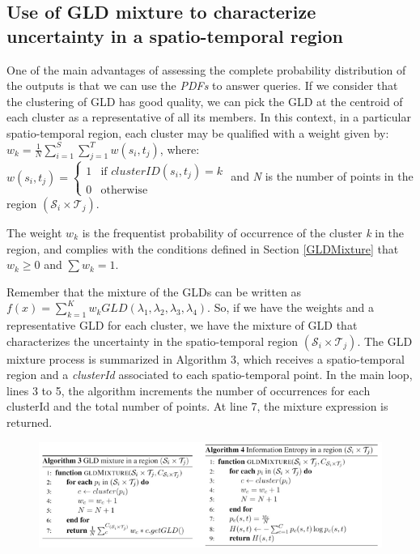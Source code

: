 \documentclass[11pt]{article}
\begin{document}
\subsection{Use of GLD mixture to characterize uncertainty in a spatio-temporal region}
\label{sub:gldMixtureWorkflow}
One of the main advantages of assessing the complete probability distribution of the outputs is that we can use the \textit{PDFs} to answer queries. If we consider that the clustering of GLD has good quality, we can pick the GLD at the centroid of each cluster as a representative of all its members. In this context, in a particular spatio-temporal region, each cluster may be qualified with a weight given by:$ w_{k}=\frac{1}{N}\sum_{i=1}^S \sum_{j=1}^T w(s_{i},t_{j})$, where: $w(s_{i},t_{j}) =
  \begin{cases}
    1 & \text{if $clusterID(s_{i},t_{j}) = k$} \\
    0 & \text{otherwise}
  \end{cases}$ and  \textit{N} is the number of points in the region $(\mathcal{S}_{i} \times \mathcal{T}_{j})$.

The weight $w_k$ is the frequentist probability of occurrence of the cluster \textit{k} in the region, and complies with the conditions defined in Section \ref{GLDMixture} that $w_{k} \geq 0$ and $\sum w_{k}=1$.

Remember that the mixture of the GLDs can be written as $f(x)=\sum_{k=1}^K w_{k}GLD(\lambda_{1},\lambda_{2},\lambda_{3},\lambda_{4})$. So, if we have the weights and a representative GLD for each cluster, we have the mixture of GLD that characterizes the uncertainty in the spatio-temporal region $(\mathcal{S}_{i} \times \mathcal{T}_{j})$. The GLD mixture process is summarized in 
Algorithm 3, which receives  a spatio-temporal region and a \textit{clusterId}  associated to each spatio-temporal point. In the main loop, lines 3 to 5, the algorithm increments the number of occurrences for each clusterId and the total number of points. At line 7, the mixture expression is returned.


\begin{figure}
    \centering
    \includegraphics{figs/Algorithms_3_4.png}
\end{figure}
\end{document}
